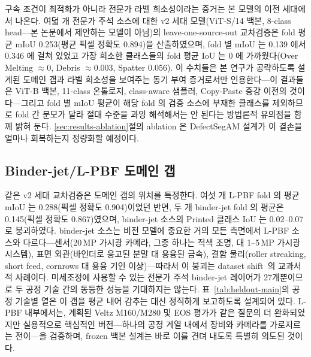 구속 조건이 최적화가 아니라 전문가 라벨 희소성이라는 증거는 본 모델의 이전
세대에서 나온다. 여덟 개 전문가 주석 소스에 대한 v2 세대 모델(ViT-S/14
백본, 8-class head---본 논문에서 제안하는 모델이 아님)의
leave-one-source-out 교차검증은 fold 평균 mIoU 0.253(평균 픽셀 정확도
0.894)을 산출하였으며, fold 별 mIoU 는 0.139 에서 0.346 에 걸쳐 있었고
가장 희소한 클래스들의 fold 평균 IoU 는 0 에 가까웠다(Over Melting
$\approx 0$, Debris $\approx 0.003$, Spatter 0.056). 이 수치들은 본 연구가
공략하도록 설계된 도메인 갭과 라벨 희소성을 보여주는 동기 부여 증거로서만
인용한다---이 결과들은 ViT-B 백본, 11-class 온톨로지, class-aware 샘플러,
Copy-Paste 증강 이전의 것이다---그리고 fold 별 mIoU 평균이 해당 fold 의
검증 소스에 부재한 클래스를 제외하므로 fold 간 분모가 달라 절대 수준을
과잉 해석해서는 안 된다는 방법론적 유의점을 함께 밝혀 둔다.
\ref{sec:results-ablation}절의 ablation 은 DefectSegAM 설계가 이 결손을
얼마나 회복하는지 정량화할 예정이다.

\subsection{Binder-jet/L-PBF 도메인 갭}
\label{sec:discussion-domaingap}

같은 v2 세대 교차검증은 도메인 갭의 위치를 특정한다. 여섯 개 L-PBF fold
의 평균 mIoU 는 0.288(픽셀 정확도 0.904)이었던 반면, 두 개 binder-jet
fold 의 평균은 0.145(픽셀 정확도 0.867)였으며, binder-jet 소스의 Printed
클래스 IoU 는 0.02--0.07 로 붕괴하였다. binder-jet 소스는 비전 모델에
중요한 거의 모든 측면에서 L-PBF 소스와 다르다---센서(20\,MP 가시광 카메라,
그중 하나는 적색 조명, 대 1--5\,MP 가시광 시스템), 표면 외관(바인더로
응고된 분말 대 용융된 금속), 결함 물리(roller streaking, short feed,
cornrows 대 용융 기인 이상)---따라서 이 붕괴는 dataset
shift~\cite{Quinonero2009DatasetShift,Torralba2011DatasetBias}의 교과서적
사례이다. 미세조정에 사용할 수 있는 전문가 주석 binder-jet 레이어가
27개뿐이므로 두 공정 기술 간의 동등한 성능을 기대하지는 않는다.
표~\ref{tab:heldout-main}의 공정 기술별 열은 이 갭을 평균 내어 감추는 대신
정직하게 보고하도록 설계되어 있다. L-PBF 내부에서는, 계획된 Veltz
M160/M280 및 EOS 평가가 같은 질문의 더 완화되었지만 실용적으로 핵심적인
버전---하나의 공정 계열 내에서 장비와 카메라를 가로지르는 전이---을
검증하며, frozen 백본 설계는 바로 이를 견뎌 내도록 특별히 의도된 것이다.

